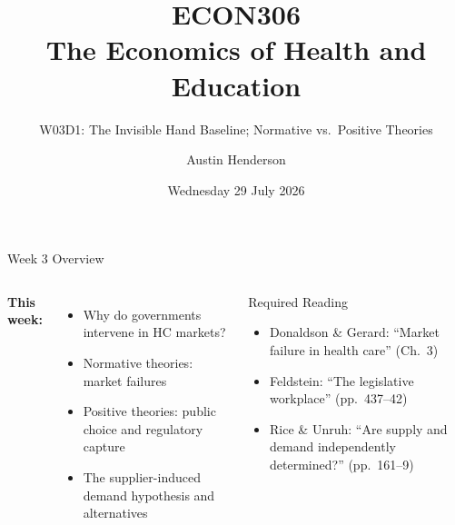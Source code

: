 \documentclass[aspectratio=169, 12pt]{beamer}
\title[ECON306: W03D1 — Invisible Hand \& Normative Theory]{ECON306\\The Economics of Health and Education}
\subtitle{W03D1: The Invisible Hand Baseline; Normative vs.\ Positive Theories}
\author{Austin Henderson}
\institute{Department of Economics\\University of Otago}
\date{Wednesday 29 July 2026}
\begin{document}
\begin{frame}[plain]
  \titlepage
\end{frame}



\begin{frame}{Week 3 Overview}
  \begin{columns}
      \textbf{This week:}
      \begin{itemize}
        \item Why do governments intervene in HC markets?
        \item Normative theories: market failures
        \item Positive theories: public choice and regulatory capture
        \item The supplier-induced demand hypothesis and alternatives
      \end{itemize}
      \begin{block}{Required Reading}
        {\small
        \begin{itemize}
          \item Donaldson \& Gerard: ``Market failure in health care'' (Ch.\ 3)
          \item Feldstein: ``The legislative workplace'' (pp.\ 437--42)
          \item Rice \& Unruh: ``Are supply and demand independently determined?'' (pp.\ 161--9)
        \end{itemize}}
      \end{block}
  \end{columns}
\end{frame}
\end{document}
